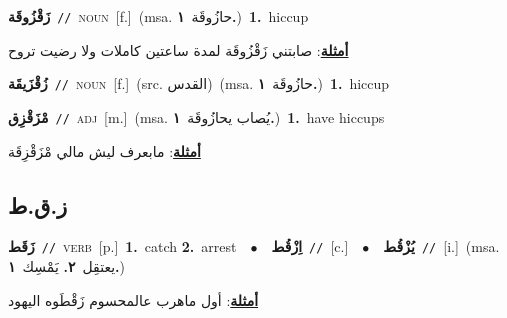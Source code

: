 \documentclass[10pt,a4paper,twoside]{article} %
\begin{document}
\begin{multicols}{2}
{\setlength\topsep{0pt}\textbf{\foreignlanguage{arabic}{زَقْزُوقَة}}\ {\color{gray}\texttt{//}\color{black}}\ \textsc{noun}\ [f.]\ \color{gray}(msa. \foreignlanguage{arabic}{حازُوقَة}~\foreignlanguage{arabic}{\textbf{١.}})\color{black}\ \textbf{1.}~hiccup\  \begin{flushright}\color{gray}\foreignlanguage{arabic}{\textbf{\underline{\foreignlanguage{arabic}{أمثلة}}}: صابتني زَقْزُوقَة لمدة ساعتين كاملات ولا رضيت تروح}\end{flushright}\color{black}} \vspace{2mm}

{\setlength\topsep{0pt}\textbf{\foreignlanguage{arabic}{زُقْزَيقَة}}\ {\color{gray}\texttt{//}\color{black}}\ \textsc{noun}\ [f.]\ (src. \color{gray}\foreignlanguage{arabic}{القدس}\color{black})\ \color{gray}(msa. \foreignlanguage{arabic}{حازُوقَة}~\foreignlanguage{arabic}{\textbf{١.}})\color{black}\ \textbf{1.}~hiccup\ } \vspace{2mm}

{\setlength\topsep{0pt}\textbf{\foreignlanguage{arabic}{مْزَقْزِق}}\ {\color{gray}\texttt{//}\color{black}}\ \textsc{adj}\ [m.]\ \color{gray}(msa. \foreignlanguage{arabic}{يُصاب يحازُوقَة}~\foreignlanguage{arabic}{\textbf{١.}})\color{black}\ \textbf{1.}~have hiccups\  \begin{flushright}\color{gray}\foreignlanguage{arabic}{\textbf{\underline{\foreignlanguage{arabic}{أمثلة}}}: مابعرف ليش مالي مْزَقْزِقَة}\end{flushright}\color{black}} \vspace{2mm}

\vspace{-3mm}
\subsection*{\color{blue}\foreignlanguage{arabic}{ز.ق.ط}\color{blue}{}} 

{\setlength\topsep{0pt}\textbf{\foreignlanguage{arabic}{زَقَط}}\ {\color{gray}\texttt{//}\color{black}}\ \textsc{verb}\ [p.]\ \textbf{1.}~catch  \textbf{2.}~arrest\ \ $\bullet$\ \ \setlength\topsep{0pt}\textbf{\foreignlanguage{arabic}{اِزْقُط}}\ {\color{gray}\texttt{//}\color{black}}\ [c.]\ \ $\bullet$\ \ \setlength\topsep{0pt}\textbf{\foreignlanguage{arabic}{يُزْقُط}}\ {\color{gray}\texttt{//}\color{black}}\ [i.]\ \color{gray}(msa. \foreignlanguage{arabic}{يعتقِل}~\foreignlanguage{arabic}{\textbf{٢.}}  \foreignlanguage{arabic}{يَمْسِك}~\foreignlanguage{arabic}{\textbf{١.}})\color{black}\  \begin{flushright}\color{gray}\foreignlanguage{arabic}{\textbf{\underline{\foreignlanguage{arabic}{أمثلة}}}: أول ماهرب عالمحسوم زَقْطَوه اليهود}\end{flushright}\color{black}} \vspace{2mm}


\end{multicols}
\end{document}
